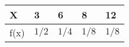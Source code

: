 \begin{center}
\begin{tabular}{|l|l|l|l|l|}
\hline
X & 3 & 6 & 8 & 12 \\ \hline
f(x) & $1/2$ & $1/4$ & $1/8$ & $1/8$ \\ \hline
\end{tabular}
\end{center}